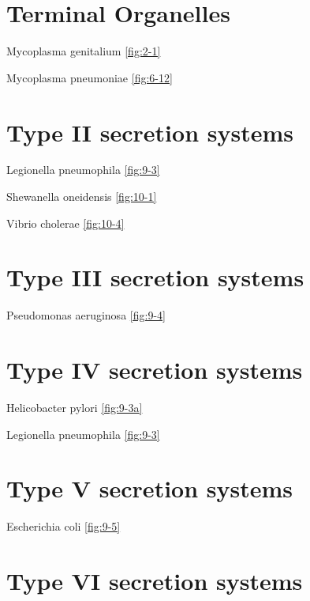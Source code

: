 \documentclass[]{tufte-book}
\begin{document}
\section{\texorpdfstring{\textbf{Terminal
Organelles}}{Terminal Organelles}}\label{terminal-organelles}

Mycoplasma genitalium \ref{fig:2-1}

Mycoplasma pneumoniae \ref{fig:6-12}

\section{\texorpdfstring{\textbf{Type II secretion
systems}}{Type II secretion systems}}\label{type-ii-secretion-systems}

Legionella pneumophila \ref{fig:9-3}

Shewanella oneidensis \ref{fig:10-1}

Vibrio cholerae \ref{fig:10-4}

\section{\texorpdfstring{\textbf{Type III secretion
systems}}{Type III secretion systems}}\label{type-iii-secretion-systems}

Pseudomonas aeruginosa \ref{fig:9-4}

\section{\texorpdfstring{\textbf{Type IV secretion
systems}}{Type IV secretion systems}}\label{type-iv-secretion-systems}

Helicobacter pylori \ref{fig:9-3a}

Legionella pneumophila \ref{fig:9-3}

\section{\texorpdfstring{\textbf{Type V secretion
systems}}{Type V secretion systems}}\label{type-v-secretion-systems}

Escherichia coli \ref{fig:9-5}

\section{\texorpdfstring{\textbf{Type VI secretion
systems}}{Type VI secretion systems}}\label{type-vi-secretion-systems}
\end{document}
